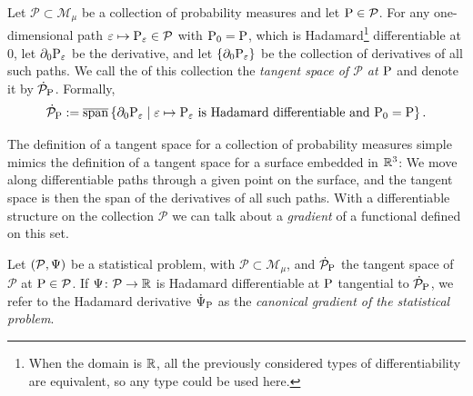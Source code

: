 \documentclass[a4,danish]{article}
\begin{document}
\begin{definition}
  Let $\mathcal{P} \subset \mathcal{M}_{\mu}$ be a collection of probability measures and let
  $\P \in \mathcal{P}$. For any one-dimensional path
  $\epsilon \mapsto \P_{\epsilon} \in \mathcal{P}$ with $\P_0 =\P$, which is Hadamard\footnote{When
    the domain is $\R$, all the previously considered types of differentiability are equivalent, so
    any type could be used here.} differentiable at 0, let $\partial_0{\P_{\epsilon}}$ be the
  derivative, and let $\{\partial_0{\P_{\epsilon}}\}$ be the collection of derivatives of all such paths. We call
  the  of this collection the \textit{tangent space of
    $\mathcal{P}$ at $\P$} and denote it by $\dot{\mathcal{P}}_{\P}$. Formally,
  \begin{equation*}
    \dot{\mathcal{P}}_{\P}
    := \overline{\mathrm{span}}
    \left\{ \partial_0{\P_{\epsilon}}
      \midd \epsilon \mapsto \P_{\epsilon} \text{ is Hadamard differentiable and } \P_0 = \P  \right\}.
  \end{equation*}
\end{definition}

The definition of a tangent space for a collection of probability measures simple mimics the
definition of a tangent space for a surface embedded in $\R^3$: We move along differentiable paths
through a given point on the surface, and the tangent space is then the span of the derivatives of
all such paths. With a differentiable structure on the collection $\mathcal{P}$ we can talk about a
\textit{gradient} of a functional defined on this set.

\begin{definition}
  \label{def:tangt-space-prob}
  Let $(\mathcal{P}, \TT)$ be a statistical problem, with $\mathcal{P} \subset \mathcal{M}_{\mu}$,
  and $\dot{\mathcal{P}}_{\P}$ the tangent space of $\mathcal{P}$ at $\P \in \mathcal{P}$. If
  $\TT \colon \mathcal{P} \rightarrow \R$ is Hadamard differentiable at $\P$ tangential to
  $\dot{\mathcal{P}}_{\P}$, we refer to the Hadamard derivative $\dot{\TT}_{\P}$ as the
  \textit{canonical gradient of the statistical problem}.
\end{definition}
\end{document}
